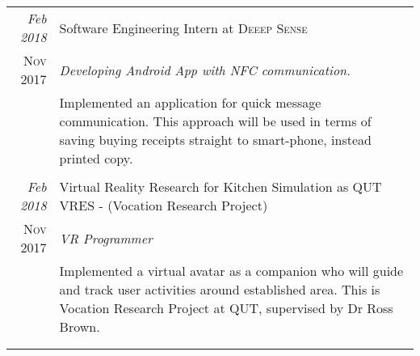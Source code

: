 \documentclass[a4paper,12pt]{article}
\begin{document}
\begin{tabular}{r|p{11cm}}
	\emph{Feb 2018} & Software Engineering Intern at \textsc{Deeep Sense} \\\textsc{Nov 2017}&\emph{Developing Android App with NFC communication.}\\&\footnotesize{Implemented an application for quick message communication. This approach will be used in terms of saving buying receipts straight to smart-phone, instead printed copy.}\\\multicolumn{2}{c}{}
\ifthenelse{\boolean{CV}}
{
    \ifthenelse {\boolean{SE}}
    {
    \\ [1pc]
	\emph{Feb 2018} & Virtual Reality Research for Kitchen Simulation as \textsc{QUT VRES} - (Vocation Research Project) \\\textsc{Nov 2017}&\emph{VR Programmer}\\&\footnotesize{Implemented a virtual avatar as a companion who will guide and track user activities around established area. This is Vocation Research Project at QUT, supervised by Dr Ross Brown.}\\\multicolumn{2}{c}{} \\ [1pc]
	} {}
}{
	
}
\end{tabular}
\newpage
{}
\end{document}

